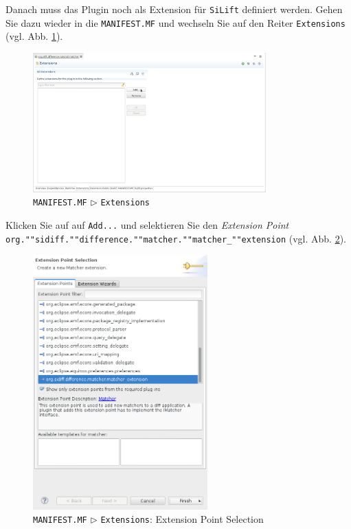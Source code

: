 \documentclass[a4paper]{scrartcl}
\begin{document}
Danach muss das Plugin noch als Extension für \texttt{SiLift} definiert werden.
Gehen Sie dazu wieder in die \texttt{MANIFEST.MF} und wechseln Sie auf den Reiter \texttt{Extensions} (vgl. Abb. \ref{silift-plugin_manifest_extensions}).

\begin{figure}[H]
\centering
\includegraphics[width=0.8\textwidth]{graphics/silift-plugin_manifest_extensions.png}
\caption{\texttt{MANIFEST.MF} $\triangleright$ \texttt{Extensions}}
\label{silift-plugin_manifest_extensions}
\end{figure}

Klicken Sie auf auf \texttt{Add...} und selektieren Sie den \textit{Extension Point} \texttt{org.""sidiff.""difference.""matcher.""matcher\_""extension} (vgl. Abb. \ref{silift-plugin_manifest_add_extension_point}).

\begin{figure}[H]
\centering
\includegraphics[width=0.6\textwidth]{graphics/silift-plugin_manifest_add_extension_point.png}
\caption{\texttt{MANIFEST.MF} $\triangleright$ \texttt{Extensions}: Extension Point Selection}
\label{silift-plugin_manifest_add_extension_point}
\end{figure}
\end{document}
